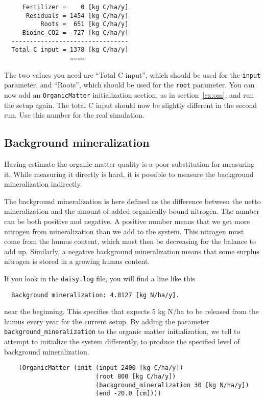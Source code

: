 \documentclass[a4paper,11pt]{article}
\begin{document}
\begin{verbatim}
     Fertilizer =    0 [kg C/ha/y]
      Residuals = 1454 [kg C/ha/y]
          Roots =  651 [kg C/ha/y]
     Bioinc_CO2 = -727 [kg C/ha/y]
  --------------------------------
  Total C input = 1378 [kg C/ha/y]
                  ====
\end{verbatim}

The two values you need are ``Total C input'', which should be used
for the \texttt{input} parameter, and ``Roots'', which should be used
for the \texttt{root} parameter.  You can now add an
\texttt{OrganicMatter} initialization section, as in
section~\ref{ex:om}, and run the setup again.  The total C input
should now be slightly different in the second run.  Use this number
for the real simulation.

\subsection{Background mineralization}
\label{sec:background}

Having \daisy{} estimate the organic matter quality is a poor
substitution for measuring it.  While measuring it directly is hard,
it is possible to measure the background mineralization indirectly. 

The background mineralization is here defined as the difference
between the netto mineralization and the amount of added organically
bound nitrogen.  The number can be both positive and negative.  A
positive number means that we get more nitrogen from mineralization
than we add to the system.  This nitrogen must come from the humus
content, which must then be decreasing for the balance to add up.
Similarly, a negative background mineralization means that some
surplus nitrogen is stored in a growing humus content.

If you look in the \texttt{daisy.log} file, you will find a line like
this
\begin{verbatim}
  Background mineralization: 4.8127 [kg N/ha/y].
\end{verbatim}
near the beginning.  This specifies that \daisy{} expects 5 kg N/ha to
be released from the humus every year for the current setup.  By
adding the parameter \texttt{background\_mineralization} to the
organic matter initialization, we tell \daisy{} to attempt to
initialize the system differently, to produce the specified level of
background mineralization.

\begin{verbatim}
    (OrganicMatter (init (input 2400 [kg C/ha/y])
                         (root 800 [kg C/ha/y])
                         (background_mineralization 30 [kg N/ha/y]) 
                         (end -20.0 [cm])))
\end{verbatim}
\end{document}
